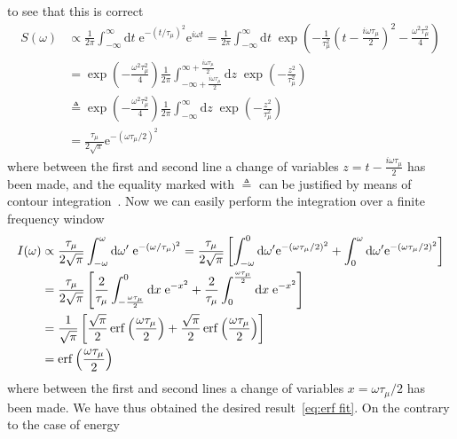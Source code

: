to see that this is correct
\begin{align}
  S(\omega) &\propto \frac{1}{2\pi} \int_{-\infty}^{\infty} \mathrm{d}t \; \mathrm{e}^{-(t/\tau_{\mu})^2}
  \mathrm{e}^{i\omega t} = \frac{1}{2\pi} \int_{-\infty}^{\infty} \mathrm{d}t \; 
  \exp\left(-\frac{1}{\tau_{\mu}^2} \left(t-\frac{i\omega\tau_{\mu}}{2}\right)^2 
  - \frac{\omega^2\tau_{\mu}^2}{4}\right) \nonumber \\
  &= \exp\left(- \frac{\omega^2\tau_{\mu}^2}{4}\right) \frac{1}{2\pi}
  \int_{-\infty+\frac{i\omega\tau_{\mu}}{2}}^{\infty+\frac{i\omega\tau_{\mu}}{2}} 
  \mathrm{d} z\; \exp\left(-\frac{z^2}{\tau_{\mu}^2}\right) \nonumber\\
  & \triangleq \exp\left(- \frac{\omega^2
  \tau_{\mu}^2}{4}\right) \frac{1}{2\pi} \int_{-\infty}^{\infty}
  \mathrm{d} z\; \exp\left(-\frac{z^2}{\tau_{\mu}^2}\right) \nonumber  \\
  &= \frac{\tau_{\mu}}{2\sqrt{\pi}}\mathrm{e}^{-(\omega \tau_{\mu}/2)^2}
\end{align}
where between the first and second line a change of variables \(z = t-\frac{i \omega \tau_{\mu}}{2}\)
has been made, and the equality marked with \(\triangleq\) can be justified by means of contour
integration~\autocite{Stein2010}. 
Now we can easily perform the integration over a finite
frequency window
\begin{align}
  I(\omega) &\propto \frac{\tau_{\mu}}{2\sqrt{\pi}}\int_{-\omega}^{\omega} \mathrm{d}\omega^{\prime}\;
  \mathrm{e}^{-(\omega/\tau_{\mu})^2} = \frac{\tau_{\mu}}{2\sqrt{\pi}}
  \left[\int_{-\omega}^{0} \mathrm{d}\omega^{\prime} \mathrm{e}^{-(\omega\tau_{\mu}/2)^2} + 
  \int_{0}^{\omega} \mathrm{d}\omega^{\prime} \mathrm{e}^{-(\omega\tau_{\mu}/2)^2} \right]\nonumber\\
  &= \frac{\tau_{\mu}}{2\sqrt{\pi}} \left[ \frac{2}{\tau_{\mu}}\int_{-\frac{\omega\tau_{\mu}}{2}}^{0} 
  \mathrm{d} x\;  \mathrm{e}^{-x^2} + \frac{2}{\tau_{\mu}}\int_{0}^{\frac{\omega\tau_{\mu}}{2}}
   \mathrm{d}x\; \mathrm{e}^{-x^2} \right]\nonumber\\ 
   &= \frac{1}{\sqrt{\pi}} \left[ \frac{\sqrt{\pi}}{2} \erf\left(\frac{\omega\tau_{\mu}}{2}\right) +
   \frac{\sqrt{\pi}}{2} \erf\left(\frac{\omega\tau_{\mu}}{2}\right) \right]\nonumber\\
    &= \erf\left(\frac{\omega\tau_{\mu}}{2}\right)
\end{align}
where between the first and second lines a change of variables \(x=\omega\tau_{\mu}/2\) has been made.
We have thus obtained the desired result~\eqref{eq:erf fit}. On the contrary to the case of energy

